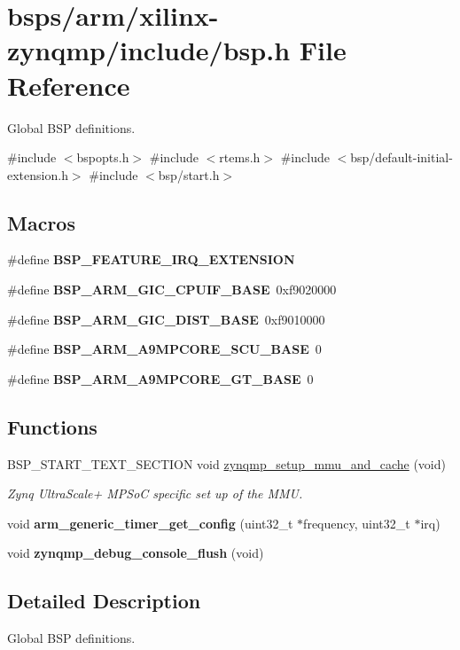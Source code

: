 \hypertarget{bsps_2arm_2xilinx-zynqmp_2include_2bsp_8h}{}\section{bsps/arm/xilinx-\/zynqmp/include/bsp.h File Reference}
\label{bsps_2arm_2xilinx-zynqmp_2include_2bsp_8h}


Global B\+SP definitions.  


{\ttfamily \#include $<$bspopts.\+h$>$}\newline
{\ttfamily \#include $<$rtems.\+h$>$}\newline
{\ttfamily \#include $<$bsp/default-\/initial-\/extension.\+h$>$}\newline
{\ttfamily \#include $<$bsp/start.\+h$>$}\newline
\subsection*{Macros}
\begin{DoxyCompactItemize}
\item 
\#define {\bfseries B\+S\+P\+\_\+\+F\+E\+A\+T\+U\+R\+E\+\_\+\+I\+R\+Q\+\_\+\+E\+X\+T\+E\+N\+S\+I\+ON}
\item 
\#define {\bfseries B\+S\+P\+\_\+\+A\+R\+M\+\_\+\+G\+I\+C\+\_\+\+C\+P\+U\+I\+F\+\_\+\+B\+A\+SE}~0xf9020000
\item 
\#define {\bfseries B\+S\+P\+\_\+\+A\+R\+M\+\_\+\+G\+I\+C\+\_\+\+D\+I\+S\+T\+\_\+\+B\+A\+SE}~0xf9010000
\item 
\#define {\bfseries B\+S\+P\+\_\+\+A\+R\+M\+\_\+\+A9\+M\+P\+C\+O\+R\+E\+\_\+\+S\+C\+U\+\_\+\+B\+A\+SE}~0
\item 
\#define {\bfseries B\+S\+P\+\_\+\+A\+R\+M\+\_\+\+A9\+M\+P\+C\+O\+R\+E\+\_\+\+G\+T\+\_\+\+B\+A\+SE}~0
\end{DoxyCompactItemize}
\subsection*{Functions}
\begin{DoxyCompactItemize}
\item 
B\+S\+P\+\_\+\+S\+T\+A\+R\+T\+\_\+\+T\+E\+X\+T\+\_\+\+S\+E\+C\+T\+I\+ON void \mbox{\hyperlink{group__RTEMSBSPsARMZynqMP_gab627dbb0ad83044bd6441e834db2350c}{zynqmp\+\_\+setup\+\_\+mmu\+\_\+and\+\_\+cache}} (void)
\begin{DoxyCompactList}\small\item\em Zynq Ultra\+Scale+ M\+P\+SoC specific set up of the M\+MU. \end{DoxyCompactList}\item 
void {\bfseries arm\+\_\+generic\+\_\+timer\+\_\+get\+\_\+config} (uint32\+\_\+t $\ast$frequency, uint32\+\_\+t $\ast$irq)
\item 
void {\bfseries zynqmp\+\_\+debug\+\_\+console\+\_\+flush} (void)
\end{DoxyCompactItemize}


\subsection{Detailed Description}
Global B\+SP definitions. 


